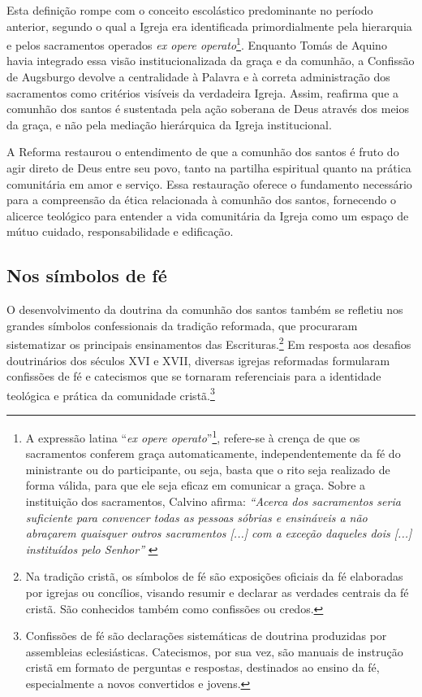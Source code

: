Esta definição rompe com o conceito escolástico predominante no período anterior, segundo o qual a Igreja era identificada primordialmente pela hierarquia e pelos sacramentos operados \textit{\foreignlanguage{latin}{ex opere operato}}\footnote{A expressão latina ``\textit{\foreignlanguage{latin}{ex opere operato}}''\footnote{Tradução nossa: obra realizada}, refere-se à crença de que os sacramentos conferem graça automaticamente, independentemente da fé do ministrante ou do participante, ou seja, basta que o rito seja realizado de forma válida, para que ele seja eficaz em comunicar a graça. Sobre a instituição dos sacramentos, Calvino afirma: \textit{``Acerca dos sacramentos seria suficiente para convencer todas as pessoas sóbrias e ensináveis a não abraçarem quaisquer outros sacramentos [...] com a exceção daqueles dois [...] instituídos pelo Senhor''} \cite[v.~4, Capítulo~XIX, p.~2605]{calvino2022}}. Enquanto Tomás de Aquino havia integrado essa visão institucionalizada da graça e da comunhão, a Confissão de Augsburgo devolve a centralidade à Palavra e à correta administração dos sacramentos como critérios visíveis da verdadeira Igreja. Assim, reafirma que a comunhão dos santos é sustentada pela ação soberana de Deus através dos meios da graça, e não pela mediação hierárquica da Igreja institucional.

A Reforma restaurou o entendimento de que a comunhão dos santos é fruto do agir direto de Deus entre seu povo, tanto na partilha espiritual quanto na prática comunitária em amor e serviço. Essa restauração oferece o fundamento necessário para a compreensão da ética relacionada à comunhão dos santos, fornecendo o alicerce teológico para entender a vida comunitária da Igreja como um espaço de mútuo cuidado, responsabilidade e edificação.

\subsection{Nos símbolos de fé}

O desenvolvimento da doutrina da comunhão dos santos também se refletiu nos grandes símbolos confessionais da tradição reformada, que procuraram sistematizar os principais ensinamentos das Escrituras.\footnote{Na tradição cristã, os símbolos de fé são exposições oficiais da fé elaboradas por igrejas ou concílios, visando resumir e declarar as verdades centrais da fé cristã. São conhecidos também como confissões ou credos.} Em resposta aos desafios doutrinários dos séculos XVI e XVII, diversas igrejas reformadas formularam confissões de fé e catecismos que se tornaram referenciais para a identidade teológica e prática da comunidade cristã.\footnote{Confissões de fé são declarações sistemáticas de doutrina produzidas por assembleias eclesiásticas. Catecismos, por sua vez, são manuais de instrução cristã em formato de perguntas e respostas, destinados ao ensino da fé, especialmente a novos convertidos e jovens.}

